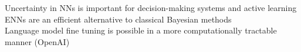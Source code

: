 \documentclass[preview]{standalone}
\begin{document}
Uncertainty in NNs is important for decision-making systems and active learning\\ENNs are an efficient alternative to classical Bayesian methods\\Language model fine tuning is possible in a more computationally tractable manner (OpenAI)\\
\end{document}

